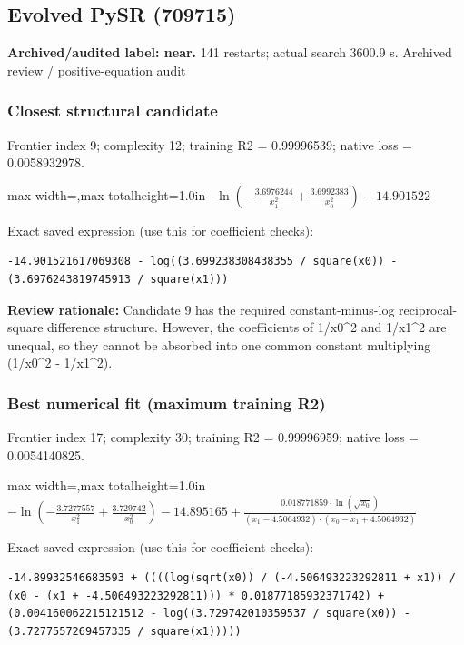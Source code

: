 \documentclass[10pt,letterpaper,landscape]{article}
\begin{document}
\begin{minipage}[t]{0.485\textwidth}
\subsection*{Evolved PySR (709715)}
\textbf{Archived/audited label: near.} 141 restarts; actual search 3600.9 s.
{\small Archived review / positive-equation audit}
\subsubsection*{Closest structural candidate}
Frontier index 9; complexity 12; training R2 = 0.99996539; native loss = 0.0058932978.
\begin{center}\begin{adjustbox}{max width=\linewidth,max totalheight=1.0in}$\displaystyle - \ln{\left(- \frac{3.6976244}{x_{1}^{2}} + \frac{3.6992383}{x_{0}^{2}} \right)} - 14.901522$\end{adjustbox}\end{center}
{\scriptsize Exact saved expression (use this for coefficient checks):}
\begin{lstlisting}
-14.901521617069308 - log((3.699238308438355 / square(x0)) - (3.6976243819745913 / square(x1)))
\end{lstlisting}
{\small\textbf{Review rationale:} Candidate 9 has the required constant-minus-log reciprocal-square difference structure. However, the coefficients of 1/x0\textasciicircum{}2 and 1/x1\textasciicircum{}2 are unequal, so they cannot be absorbed into one common constant multiplying (1/x0\textasciicircum{}2 - 1/x1\textasciicircum{}2).}
\subsubsection*{Best numerical fit (maximum training R2)}
Frontier index 17; complexity 30; training R2 = 0.99996959; native loss = 0.0054140825.
\begin{center}\begin{adjustbox}{max width=\linewidth,max totalheight=1.0in}$\displaystyle - \ln{\left(- \frac{3.7277557}{x_{1}^{2}} + \frac{3.729742}{x_{0}^{2}} \right)} - 14.895165 + \frac{0.018771859 \cdot \ln{\left(\sqrt{x_{0}} \right)}}{\left(x_{1} - 4.5064932\right) \cdot \left(x_{0} - x_{1} + 4.5064932\right)}$\end{adjustbox}\end{center}
{\scriptsize Exact saved expression (use this for coefficient checks):}
\begin{lstlisting}
-14.89932546683593 + ((((log(sqrt(x0)) / (-4.506493223292811 + x1)) / (x0 - (x1 + -4.506493223292811))) * 0.01877185932371742) + (0.004160062215121512 - log((3.729742010359537 / square(x0)) - (3.7277557269457335 / square(x1)))))
\end{lstlisting}
\end{minipage}
\clearpage{}\label{rydberg-10003}
\end{document}
